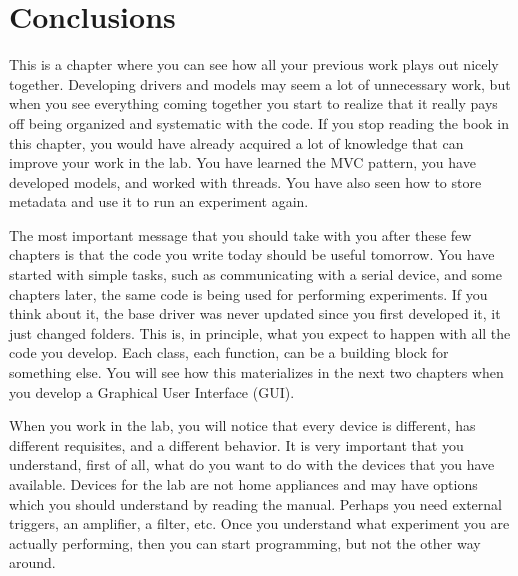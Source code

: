 \section{Conclusions}\label{conclusions}
This is a chapter where you can see how all your previous work plays out
nicely together. Developing drivers and models may seem a lot of
unnecessary work, but when you see everything coming together you start
to realize that it really pays off being organized and systematic with
the code. If you stop reading the book in this chapter, you would have
already acquired a lot of knowledge that can improve your work in the
lab. You have learned the {MVC} pattern, you have developed models, and
worked with threads. You have also seen how to store metadata and use it
to run an experiment again.

The most important message that you should take with you after these few
chapters is that the code you write today should be useful tomorrow.
You have started with simple tasks, such as communicating with a serial
device, and some chapters later, the same code is being used for
performing experiments. If you think about it, the base driver was never
updated since you first developed it, it just changed folders. This is,
in principle, what you expect to happen with all the code you develop.
Each class, each function, can be a building block for something else.
You will see how this materializes in the next two chapters when you
develop a Graphical User Interface ({GUI}).

When you work in the lab, you will notice that every device is
different, has different requisites, and a different behavior. It is
very important that you understand, first of all, what do you want to do
with the devices that you have available. Devices for the lab are not
home appliances and may have options which you should understand by
reading the manual. Perhaps you need external triggers, an amplifier, a
filter, etc. Once you understand what experiment you are actually
performing, then you can start programming, but not the other
way around.
